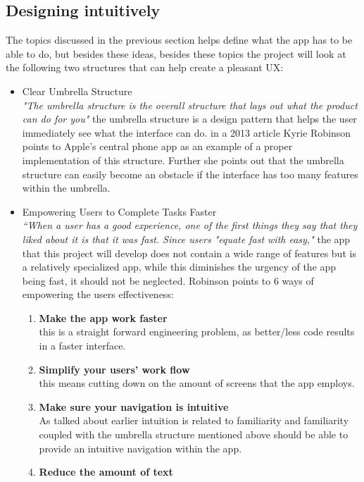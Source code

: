 \subsection{ Designing intuitively  }
The topics discussed in the previous section helps define what the app has to be able to do, but besides these ideas, besides these topics the project will look at the following two structures that can help create a pleasant UX:
\begin{itemize}
\item Clear Umbrella Structure\\
\textit{"The umbrella structure is the overall structure that lays out what the product can do for you"}\cite{UXKeys} the umbrella structure is a design pattern that helps the user immediately see what the interface can do. in a 2013 article Kyrie Robinson points to Apple's central phone app as an example of a proper implementation of this structure. Further she points out that the umbrella structure can easily become an obstacle if the interface has too many features within the umbrella. 
\item  Empowering Users to Complete Tasks Faster\\
 \textit{“When a user has a good experience, one of the first things they say that they liked about it is that it was fast. Since users "equate fast with easy," }\cite{UXKeys} the app that this project will develop does not contain a wide range of features but is a relatively specialized app, while this diminishes the urgency of the app being fast, it should not be neglected. Robinson points to 6 ways of empowering the users effectiveness:
 \begin{enumerate}
 \item \textbf{Make the app work faster}\\
 this is a straight forward engineering problem, as better/less code results in a faster interface. 
 \item \textbf{Simplify your users’ work flow}\\
  this means cutting down on the amount of screens that the app employs.
 \item \textbf{Make sure your navigation is intuitive}\\\label{effectivenessP3}
 As talked about earlier intuition is related to familiarity and familiarity coupled with the umbrella structure mentioned above should be able to provide an intuitive navigation within the app.
 \item \textbf{Reduce the amount of text}\\

\end{enumerate}
\end{itemize}
